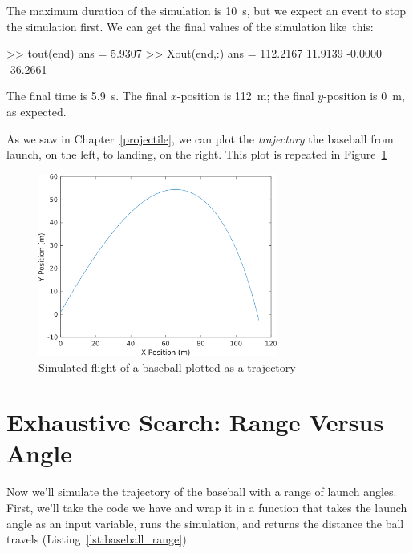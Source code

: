 
The maximum duration of the simulation is \SI{10}{\second}, but we expect an event to stop the simulation first.  We can get the final values of the simulation like~this:

\begin{code}
>> tout(end)
ans =
    5.9307
>> Xout(end,:)
ans =
  112.2167   11.9139   -0.0000  -36.2661
\end{code}

The final time is \SI{5.9}{\second}.  The final $x$-position is \SI{112}{\meter}; the final $y$-position is \SI{0}{m}, as expected.



As we saw in Chapter~\ref{projectile}, we can plot the \emph{trajectory} the baseball from launch, on the left, to landing, on the right.  This plot is repeated in Figure~\ref{f:baseball3}

\begin{figure}[h]
\centerline{\includegraphics[width=0.7\textwidth]{../code/chap_twodimensions/baseball2_xy.png}}
\caption{Simulated flight of a baseball plotted as a trajectory}
\label{f:baseball3}
\end{figure}



\section{Exhaustive Search: Range Versus Angle}

Now we'll simulate the trajectory of the baseball with a range of launch angles.  First, we'll take the code we have and wrap it in a function that takes the launch angle as an input variable, runs the simulation, and returns the distance the ball travels (Listing~\ref{lst:baseball_range}).

